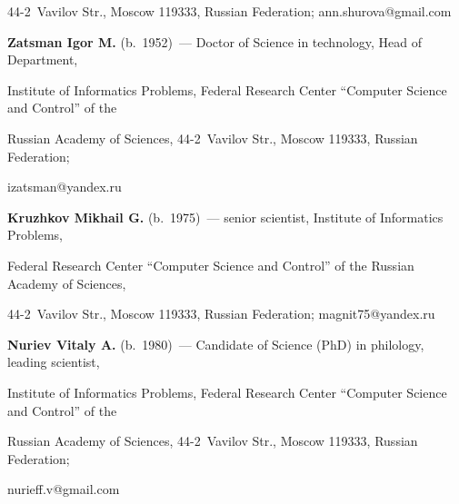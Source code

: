 44-2~Vavilov Str., Moscow 119333, Russian Federation; \mbox{ann.shurova@gmail.com}





\vspace*{3pt}





\noindent


\textbf{Zatsman Igor M.} (b.\ 1952)~--- Doctor of Science in technology, Head of Department, 


Institute of Informatics Problems, Federal Research Center ``Computer Science and Control'' of the 


Russian Academy of Sciences, 44-2~Vavilov Str., Moscow 119333, Russian Federation; 


\mbox{izatsman@yandex.ru}





\vspace*{3pt}





\noindent


\textbf{Kruzhkov Mikhail G.} (b.\ 1975)~--- senior scientist, Institute of Informatics Problems, 


Federal Research Center ``Computer Science and Control'' of the Russian Academy of Sciences, 


44-2~Vavilov Str., Moscow 119333, Russian Federation; \mbox{magnit75@yandex.ru}





\vspace*{3pt}





\noindent


\textbf{Nuriev Vitaly A.} (b.\ 1980)~--- Candidate of Science (PhD) in philology, leading scientist, 


Institute of Informatics Problems, Federal Research Center ``Computer Science and Control'' of the 


Russian Academy of Sciences, 44-2~Vavilov Str., Moscow 119333, Russian Federation; 


\mbox{nurieff.v@gmail.com}








\label{end\stat}





\renewcommand{\bibname}{\protect\rm Литература} 


